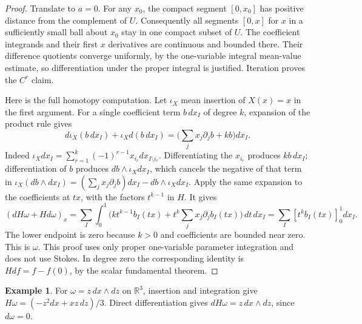 \documentclass[11pt,oneside,openany]{book}
\theoremstyle{definition}
\newtheorem{example}[theorem]{Example}
\theoremstyle{remark}
\newcommand{\R}{\mathbb R}
\begin{document}
\begin{proof}
Translate to $a=0$. For any $x_0$, the compact segment $[0,x_0]$ has positive
distance from the complement of $U$. Consequently all segments $[0,x]$
for $x$ in a sufficiently small ball about $x_0$ stay in one compact subset
of $U$. The coefficient integrands and their first $x$ derivatives are
continuous and bounded there. Their difference quotients converge uniformly,
by the one-variable integral mean-value estimate, so differentiation under
the proper integral is justified. Iteration proves the $C^r$ claim.

Here is the full homotopy computation. Let $\iota_X$ mean insertion of
$X(x)=x$ in the first argument. For a single coefficient term $b\,dx_I$ of
degree $k$, expansion of the product rule gives
\[
 d\iota_X(b\,dx_I)+\iota_X d(b\,dx_I)
 =\bigl(\sum_jx_j\partial_jb+kb\bigr)dx_I.
\]
Indeed $\iota_Xdx_I=\sum_{r=1}^k(-1)^{r-1}x_{i_r}dx_{I\setminus i_r}$.
Differentiating the $x_{i_r}$ produces $k b\,dx_I$; differentiation of $b$
produces $db\wedge\iota_Xdx_I$, which cancels the negative of that term
in $\iota_X(db\wedge dx_I)=(\sum_jx_j\partial_jb)dx_I-db\wedge\iota_Xdx_I$.
Apply the same expansion to the coefficients at $tx$, with the factors
$t^{k-1}$ in $H$. It gives
\[
 (dH\omega+Hd\omega)_x
 =\sum_I\int_0^1\bigl(kt^{k-1}b_I(tx)
       +t^k\sum_jx_j\partial_jb_I(tx)\bigr)\,dt\,dx_I
 =\sum_I[t^kb_I(tx)]_0^1dx_I.
\]
The lower endpoint is zero because $k>0$ and coefficients are bounded near
zero. This is $\omega$. This proof uses only proper one-variable parameter
integration and does not use Stokes. In degree zero the corresponding
identity is $Hdf=f-f(0)$, by the scalar fundamental theorem.
\end{proof}

\begin{example}\label{d04:13:homotopy-example}
For $\omega=z\,dx\wedge dz$ on $\R^3$, insertion and integration give
$H\omega=(-z^2dx+xz\,dz)/3$. Direct differentiation gives
$dH\omega=z\,dx\wedge dz$, since $d\omega=0$.
\end{example}
\end{document}
